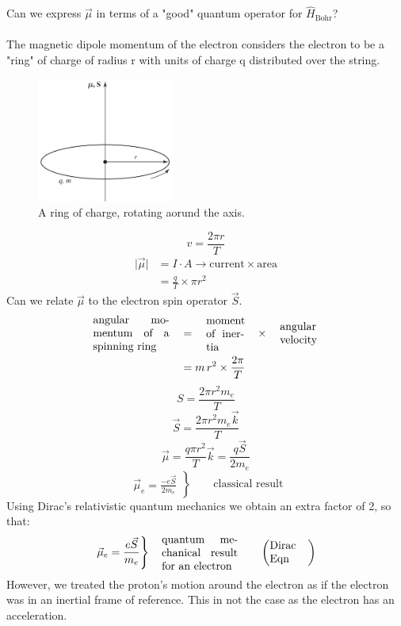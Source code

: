 \documentclass[12pt,fancychapters]{report}
\numberwithin{equation}{section}
\begin{document}
Can we express $\vec{\mu}$ in terms of a "good" quantum operator for $\hat{H}_\text{Bohr}$?\\
\\
The magnetic dipole momentum of the electron considers the electron to be a "ring" 
of charge of radius r with units of charge q distributed over the string.
\begin{figure}[H]
  \centering
	\includegraphics[width=0.4\textwidth]{../Figures/RNG.png}
  \caption{A ring of charge, rotating aorund the axis.}
\end{figure}
$$
v = \frac{2\pi r}{T}
$$
\begin{align*}
  \big|\vec{\mu}\big| &= I\cdot A \longrightarrow \text{current}\times\text{area}\\
                      &= \frac{q}{T} \times \pi r^2
\end{align*}
Can we relate $\vec{\mu}$ to the electron spin operator $\vec{S}$.
\begin{align*}
  \parbox{0.2\textwidth}{angular momentum of a spinning ring} 
  \quad &= \quad \parbox{0.1\textwidth}{moment of inertia} \quad \times \quad
  \parbox{0.1\textwidth}{angular velocity}\\
        &= m\,r^2 \times \frac{2\pi}{T}
\end{align*}
\[
  S  = \frac{2\pi r^2m_e}{T}
\]
\[
  \vec{S} = \frac{2\pi r^2 m_e \vec{k}}{T}
\]
\[
  \vec{\mu} = \frac{q \pi r^2}{T}\vec{k} = \frac{q\vec{S}}{2m_e}
\]
\[
  \left.\begin{aligned}
        \vec{\mu}_e = \frac{-e\vec{S}}{2m_e}
       \end{aligned}
 \right\}
 \qquad \text{classical result}
\]
Using Dirac's relativistic quantum mechanics we obtain an extra factor of 2, so that:
\[
  \left.
  \vec{\mu}_e = \frac{e \vec{S}}{m_e}
\right\} \quad
\parbox{0.2\textwidth}{quantum mechanical result for an electron}
\qquad \left(\parbox{0.1\textwidth}{Dirac Eqn} \right)
\]
However, we treated the proton's motion around the electron as if the electron was in an inertial
frame of reference.
This in not the case as the electron has an acceleration.
\end{document}

